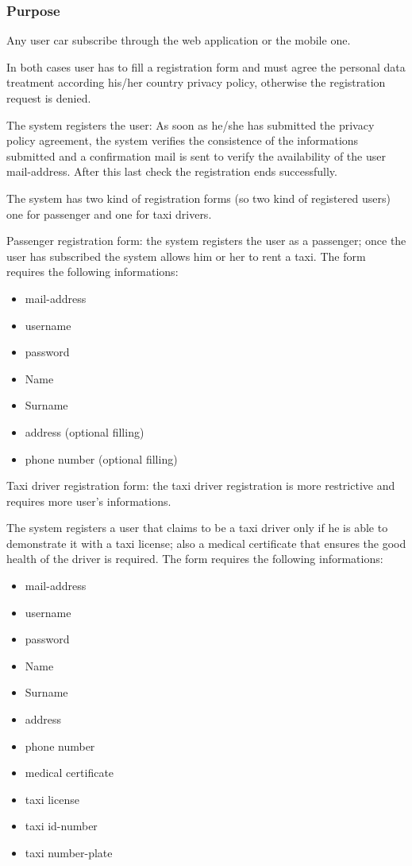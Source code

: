 \label{user-registration}
\subsubsection{Purpose}
Any user car subscribe through the web application or the mobile one. 

In both cases user has to fill a registration form and must agree the personal data treatment according his/her country privacy policy, otherwise the registration request is denied.

The system registers the user: 
As soon as he/she has submitted the privacy policy agreement, the system verifies the consistence of the informations submitted and a confirmation mail is sent to verify the availability of the user mail-address. 
After this last check the registration ends successfully.

The system has two kind of registration forms (so two kind of registered users) one for passenger and one for taxi drivers.



Passenger registration form: the system registers the user as a passenger; once the user has subscribed the system allows him or her to rent a taxi. 
The form requires the following informations:
\begin{itemize}
\item mail-address
\item username 
\item password
\item Name
\item Surname
\item address (optional filling)
\item phone number (optional filling)
\end{itemize}




Taxi driver registration form: the taxi driver registration is more restrictive and requires more user's informations.

The system registers a user that claims to be a taxi driver only if he is able to demonstrate it with a taxi license; also a medical certificate that ensures the good health of the driver is required.
The form requires the following informations:

\begin{itemize}
\item mail-address
\item username 
\item password
\item Name
\item Surname
\item address 
\item phone number
\item medical certificate
\item taxi license
\item taxi id-number
\item taxi number-plate
\end{itemize}



